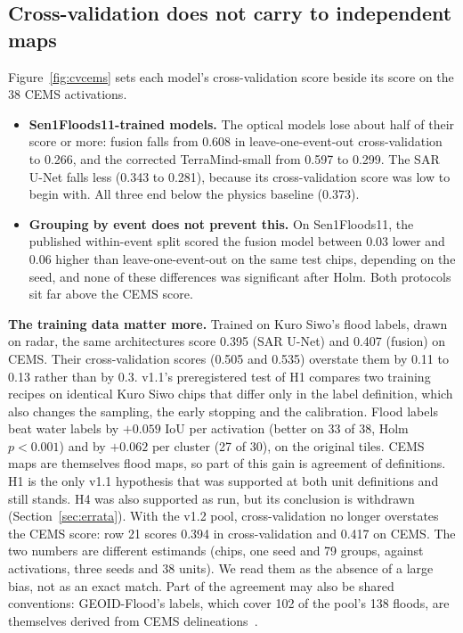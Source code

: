 \documentclass[10pt,twocolumn,a4paper]{article}
\begin{document}
\subsection{Cross-validation does not carry to independent maps}\label{sec:gap}
Figure~\ref{fig:cvcems} sets each model's cross-validation score beside its score on the 38 CEMS activations.
\begin{itemize}
  \item \textbf{Sen1Floods11-trained models.} The optical models lose about half of their score or more: fusion falls from
    0.608 in leave-one-event-out cross-validation to 0.266, and the corrected TerraMind-small from 0.597 to 0.299. The
    SAR U-Net falls less (0.343 to 0.281), because its cross-validation score was low to begin with. All three end
    below the physics baseline (0.373).
  \item \textbf{Grouping by event does not prevent this.} On Sen1Floods11, the published within-event split scored the
    fusion model between 0.03 lower and 0.06 higher than leave-one-event-out on the same test chips, depending on the
    seed, and none of these differences was significant after Holm. Both protocols sit far above the CEMS score.
\end{itemize}

\textbf{The training data matter more.} Trained on Kuro Siwo's flood labels, drawn on radar, the same architectures score
0.395 (SAR U-Net) and 0.407 (fusion) on CEMS. Their cross-validation scores (0.505 and 0.535) overstate them by 0.11
to 0.13 rather than by 0.3.
v1.1's preregistered test of H1 compares two training recipes on identical Kuro Siwo chips that differ only in the
label definition, which also changes the sampling, the early stopping and the calibration. Flood labels beat water
labels by $+0.059$ IoU per activation (better on 33 of 38, Holm $p<0.001$) and by $+0.062$ per cluster (27 of 30),
on the original tiles. CEMS maps are themselves flood maps, so part of this gain is agreement of definitions.
H1 is the only v1.1 hypothesis that was supported at both unit definitions and still stands. H4 was also supported as
run, but its conclusion is withdrawn (Section~\ref{sec:errata}).
With the v1.2 pool, cross-validation no longer overstates the CEMS score: row 21 scores 0.394 in cross-validation and
0.417 on CEMS. The two numbers are different estimands (chips, one seed and 79 groups, against activations, three
seeds and 38 units). We read them as the absence of a large bias, not as an exact match. Part of the agreement may
also be shared conventions: GEOID-Flood's labels, which cover 102 of the pool's 138 floods, are themselves derived
from CEMS delineations~\citep{chiriaco2026geoid}.
\end{document}

